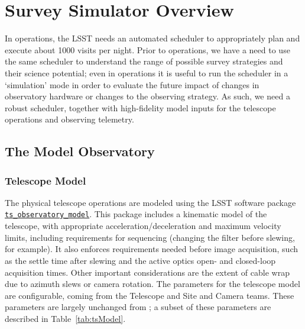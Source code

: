 \section{Survey Simulator Overview}
\label{section:simulator}

In operations, the LSST needs an automated scheduler to appropriately plan and execute about 1000 visits per night. Prior to operations, we have a need to use the same scheduler to understand the range of possible survey strategies and their science potential; even in operations it is useful to run the scheduler in a `simulation' mode in order to evaluate the future impact of changes in observatory hardware or changes to the observing strategy. As such, we need a robust scheduler, together with high-fidelity model inputs for the telescope operations and observing telemetry.  

\subsection{The Model Observatory}


\subsubsection{Telescope Model}

The physical telescope operations are modeled using the LSST software package \href{https://github.com/lsst-ts/ts_observatory_model}{\tt ts\_observatory\_model}. This package includes a kinematic model of the telescope, with appropriate acceleration/deceleration and maximum velocity limits, including requirements for sequencing (changing the filter before slewing, for example). It also enforces requirements needed before image acquisition, such as the settle time after slewing and the active optics open- and closed-loop acquisition times. Other important considerations are the extent of cable wrap due to azimuth slews or camera rotation. The parameters for the telescope model are configurable, coming from the Telescope and Site and Camera teams. These parameters are largely unchanged from \citet{Delgado14}; a subset of these parameters are described in Table~\ref{tab:tsModel}. 

